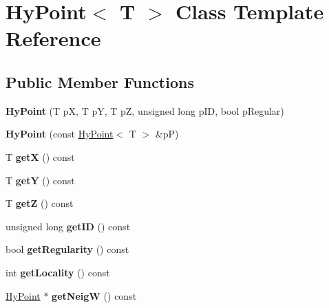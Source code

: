 \hypertarget{classHyPoint}{
\section{HyPoint$<$ T $>$ Class Template Reference}
\label{classHyPoint}
}
\subsection*{Public Member Functions}
\begin{DoxyCompactItemize}
\item 
\hypertarget{classHyPoint_a7a2e22bc7a8dca02d24a2d912ca6f9b5}{
{\bfseries HyPoint} (T pX, T pY, T pZ, unsigned long pID, bool pRegular)}
\label{classHyPoint_a7a2e22bc7a8dca02d24a2d912ca6f9b5}

\item 
\hypertarget{classHyPoint_ad7001ba0937ec5dfb2ed24971a1010c3}{
{\bfseries HyPoint} (const \hyperlink{classHyPoint}{HyPoint}$<$ T $>$ \&pP)}
\label{classHyPoint_ad7001ba0937ec5dfb2ed24971a1010c3}

\item 
\hypertarget{classHyPoint_a93b8eec7ce456bec263dc58c4f874909}{
T {\bfseries getX} () const }
\label{classHyPoint_a93b8eec7ce456bec263dc58c4f874909}

\item 
\hypertarget{classHyPoint_ae2e111bf01c6df94a288b7dd6c9eeb47}{
T {\bfseries getY} () const }
\label{classHyPoint_ae2e111bf01c6df94a288b7dd6c9eeb47}

\item 
\hypertarget{classHyPoint_a08f9cf8a0e917427e034208bb6329e11}{
T {\bfseries getZ} () const }
\label{classHyPoint_a08f9cf8a0e917427e034208bb6329e11}

\item 
\hypertarget{classHyPoint_ad4d4bd3a4d53f31431b530728e84aa16}{
unsigned long {\bfseries getID} () const }
\label{classHyPoint_ad4d4bd3a4d53f31431b530728e84aa16}

\item 
\hypertarget{classHyPoint_a69b5f761ddd90503dbea866ffdb33405}{
bool {\bfseries getRegularity} () const }
\label{classHyPoint_a69b5f761ddd90503dbea866ffdb33405}

\item 
\hypertarget{classHyPoint_a65d48c97d8bdfdcbdb24338470117ab7}{
int {\bfseries getLocality} () const }
\label{classHyPoint_a65d48c97d8bdfdcbdb24338470117ab7}

\item 
\hypertarget{classHyPoint_a9ca2e309a2b8f23f84f655fa18699c8d}{
\hyperlink{classHyPoint}{HyPoint} $\ast$ {\bfseries getNeigW} () const }
\label{classHyPoint_a9ca2e309a2b8f23f84f655fa18699c8d}


\end{DoxyCompactItemize}
